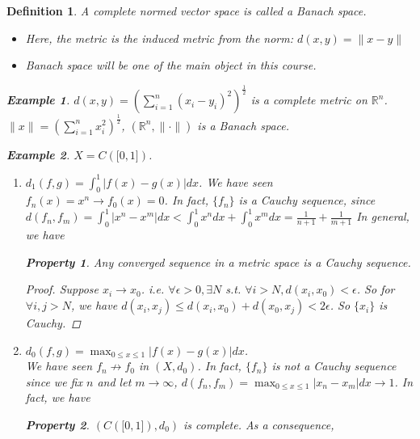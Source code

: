 \documentclass{article}
\newtheorem*{property}{Property}
\newtheorem*{definition}{Definition}
\newtheorem*{example}{Example}
\begin{document}
\begin{definition}
    A complete normed vector space is called a Banach space.
    \begin{itemize}
        \item Here, the metric is the induced metric from the norm: $d(x, y) = \|x - y\|$
        \item Banach space will be one of the main object in this course.
    \end{itemize}
    \begin{example}
        $d(x, y) = (\sum_{i=1}^{n}{(x_i-y_i)^2})^\frac{1}{2}$ is a complete metric on $\mathbb{R}^n$.\\
        $\|x\|=(\sum_{i=1}^{n}{x_i^2})^\frac{1}{2}$, $(\mathbb{R}^n, \|\cdot\|)$ is a Banach space.
    \end{example}
    \begin{example}
        $X=C(\bigl[0, 1\bigr])$.
        \begin{enumerate}
            \item $d_1(f, g) = \int_{0}^{1}{|f(x) - g(x)|dx}$.
            We have seen $f_n(x) = x^n \rightarrow f_0(x) = 0$.
            In fact, $\{f_n\}$ is a Cauchy sequence, since
            $d(f_n, f_m) = \int_{0}^{1}|x^n - x^m|dx < \int_{0}^{1}{x^ndx} + \int_{0}^{1}{x^mdx}=\frac{1}{n+1} + \frac{1}{m+1}$
            In general, we have
            \begin{property}
                Any converged sequence in a metric space is a Cauchy sequence.
                \begin{proof}
                    Suppose $x_i \rightarrow x_0$. i.e. $\forall \epsilon > 0, \exists N$ s.t.
                    $\forall i > N, d(x_i, x_0) < \epsilon$.
                    So for $\forall i, j > N$, we have
                    $d(x_i, x_j) \le d(x_i, x_0) + d(x_0, x_j) < 2\epsilon$.
                    So $\{x_i\}$ is Cauchy.
                \end{proof}
            \end{property}
            \item $d_0(f, g) = \max_{0 \le x \le 1}{|f(x) - g(x)|dx}$.\\
            We have seen $f_n \not\rightarrow f_0$ in $(X, d_0)$.
            In fact, $\{f_n\}$ is not a Cauchy sequence since we fix $n$ and let $m \rightarrow \infty$,
            $d(f_n, f_m) = \max_{0 \le x \le 1}{|x_n - x_m|dx} \rightarrow 1$.
            In fact, we have 
            \begin{property}
                $(C(\bigl[0, 1\bigr]), d_0)$ is complete. As a consequence, \\

\end{property}
\end{enumerate}
\end{example}
\end{definition}
\end{document}
